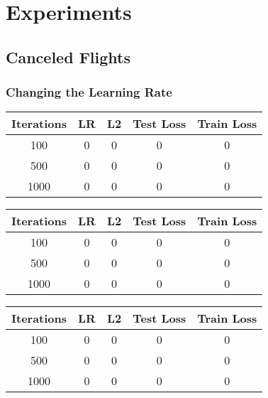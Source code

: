 \documentclass[
	letterpaper, %
	10pt, %
]{class}
\begin{document}

\section{Experiments}

\subsection{Canceled Flights}

\subsubsection{Changing the Learning Rate}

\begin{center}
	\begin{tabular}{ |c|c|c|c|c| }
		\hline
		Iterations & LR & L2 & Test Loss & Train Loss \\
		\hline
		100        & 0  & 0  & 0         & 0          \\
		500        & 0  & 0  & 0         & 0          \\
		1000       & 0  & 0  & 0         & 0          \\
		\hline
	\end{tabular}
\end{center}

\begin{center}
	\begin{tabular}{ |c|c|c|c|c| }
		\hline
		Iterations & LR & L2 & Test Loss & Train Loss \\
		\hline
		100        & 0  & 0  & 0         & 0          \\
		500        & 0  & 0  & 0         & 0          \\
		1000       & 0  & 0  & 0         & 0          \\
		\hline
	\end{tabular}
\end{center}

\begin{center}
	\begin{tabular}{ |c|c|c|c|c| }
		\hline
		Iterations & LR & L2 & Test Loss & Train Loss \\
		\hline
		100        & 0  & 0  & 0         & 0          \\
		500        & 0  & 0  & 0         & 0          \\
		1000       & 0  & 0  & 0         & 0          \\
		\hline
	\end{tabular}
\end{center}
\end{document}
